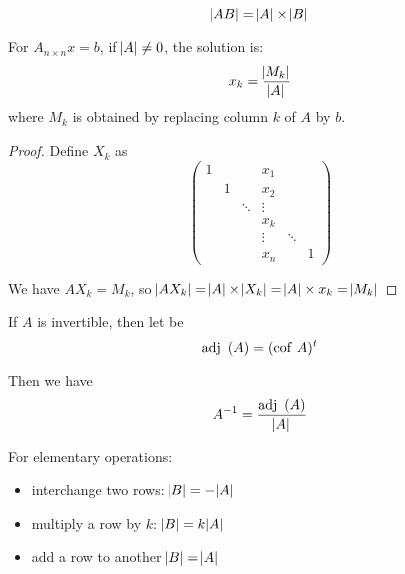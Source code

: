 \begin{theorem}
    \begin{equation}
        \abs{AB} = \abs{A} \times \abs{B}
    \end{equation}    
\end{theorem}


\begin{theorem}
    For $A_{n \times n}x=b$, if $\abs{A} \neq 0$, the solution is:
    \begin{equation}
        x_k = \frac{\abs{M_k}}{\abs{A}}
    \end{equation}
    where $M_k$ is obtained by replacing column $k$ of $A$ by $b$.
\end{theorem}
\begin{proof}
    Define $X_k$ as 
    \begin{equation*}
        \begin{pmatrix}
        1 &   &   & x_1 &  \\
          & 1 &   & x_2 &  \\
          &   & \ddots & \vdots \\
          &   &        &  x_k & \\
          &&& \vdots & \ddots \\
          &&& x_n & & 1          
        \end{pmatrix}
    \end{equation*}
    
    We have $A X_k = M_k$, so $\abs{A X_k} = \abs{A} \times \abs{X_k} = \abs{A} \times x_k = \abs{M_k}$
\end{proof}

\begin{theorem}
    If $A$ is invertible, then let  be
    \begin{equation}
        \displaystyle \mathrm{adj}~\left( A \right) = (\displaystyle \mathrm{cof}~\displaystyle A)^t
    \end{equation}
    
    Then we have
    \begin{equation}
        {A}^{-1} = \frac{\displaystyle \mathrm{adj}~\left( A \right)}{\abs{A}}
    \end{equation}    
\end{theorem}


\begin{theorem}
  For elementary operations:
\begin{itemize}
    \item interchange two rows: $\abs{B} = - \abs{A}$ 
    \item multiply a row by $k$: $\abs{B} = k \abs{A}$
    \item add a row to another $\abs{B} = \abs{A}$
\end{itemize}  
\end{theorem}

